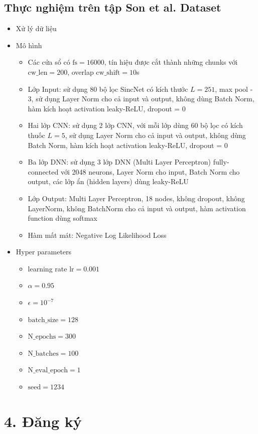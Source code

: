 \documentclass{article}
\begin{document}
	\subsection{Thực nghiệm trên tập Son et al. Dataset}
	\begin{itemize}
		\item Xử lý dữ liệu
		\item Mô hình 
		\begin{itemize}
			\item Các cửa sổ có $\text{fs} = 16000$, tín hiệu được cắt thành những chunks với $\text{cw\_len}=200$, overlap $\text{cw\_shift}=10$s
			\item Lớp Input: sử dụng 80 bộ lọc SincNet có kích thước $L=251$, max pool - 3, sử dụng Layer Norm cho cả input và output, không dùng Batch Norm, hàm kích hoạt activation leaky-ReLU, dropout = 0
			\item Hai lớp CNN: sử dụng 2 lớp CNN, với mỗi lớp dùng 60 bộ lọc có kích thuốc $L=5$, sử dụng Layer Norm cho cả input và output, không dùng Batch Norm, hàm kích hoạt activation leaky-ReLU, dropout = 0
			\item Ba lớp DNN: sử dụng 3 lớp DNN (Multi Layer Perceptron) fully-connected với 2048 neurons, Layer Norm cho input, Batch Norm cho output, các lớp ẩn (hidden layers) dùng leaky-ReLU
			\item Lớp Output: Multi Layer Perceptron, 18 nodes, không dropout, không LayerNorm, không BatchNorm cho cả input và output, hàm activation function dùng softmax
			\item Hàm mất mát: Negative Log Likelihood Loss
		\end{itemize}
		\item Hyper parameters
		\begin{itemize}
			\item learning rate $\text{lr} = 0.001$
			\item $\alpha = 0.95$
			\item $\epsilon = 10^{-7}$
			\item $\text{batch\_size}=128$
			\item $\text{N\_epochs}=300$
			\item $\text{N\_batches}=100$
			\item $\text{N\_eval\_epoch}=1$
			\item $\text{seed}=1234$
		\end{itemize}
	\end{itemize}
	\section{4. Đăng ký}
	
\end{document}
